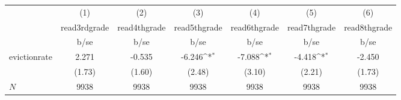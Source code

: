 {
\def\sym#1{\ifmmode^{#1}\else\(^{#1}\)\fi}
\begin{tabular}{l*{6}{c}}
\hline\hline
            &\multicolumn{1}{c}{(1)}           &\multicolumn{1}{c}{(2)}           &\multicolumn{1}{c}{(3)}           &\multicolumn{1}{c}{(4)}           &\multicolumn{1}{c}{(5)}           &\multicolumn{1}{c}{(6)}           \\
            &\multicolumn{1}{c}{read3rdgrade}  &\multicolumn{1}{c}{read4thgrade}  &\multicolumn{1}{c}{read5thgrade}  &\multicolumn{1}{c}{read6thgrade}  &\multicolumn{1}{c}{read7thgrade}  &\multicolumn{1}{c}{read8thgrade}  \\
            &                     b/se         &                     b/se         &                     b/se         &                     b/se         &                     b/se         &                     b/se         \\
\hline
evictionrate&                    2.271         &                   -0.535         &                   -6.246\sym{*}  &                   -7.088\sym{*}  &                   -4.418\sym{*}  &                   -2.450         \\
            &                   (1.73)         &                   (1.60)         &                   (2.48)         &                   (3.10)         &                   (2.21)         &                   (1.73)         \\
\hline
\(N\)       &                     9938         &                     9938         &                     9938         &                     9938         &                     9938         &                     9938         \\
\hline\hline
\end{tabular}
}
